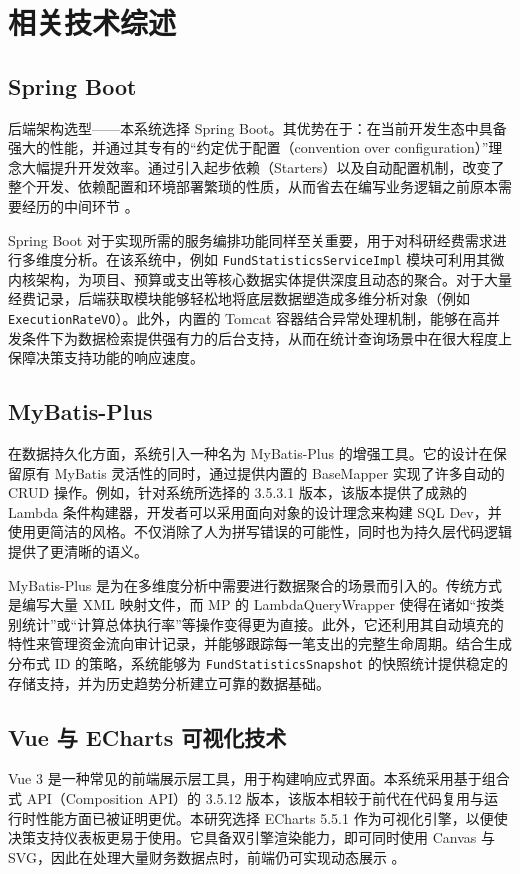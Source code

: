 \chapter{相关技术综述}
\section{Spring Boot}
后端架构选型——本系统选择 Spring Boot。其优势在于：在当前开发生态中具备强大的性能，并通过其专有的“约定优于配置（convention over configuration）”理念大幅提升开发效率。通过引入起步依赖（Starters）以及自动配置机制，改变了整个开发、依赖配置和环境部署繁琐的性质，从而省去在编写业务逻辑之前原本需要经历的中间环节 \cite{Yang2021, Zhao2020}。

Spring Boot 对于实现所需的服务编排功能同样至关重要，用于对科研经费需求进行多维度分析。在该系统中，例如 \texttt{FundStatisticsServiceImpl} 模块可利用其微内核架构，为项目、预算或支出等核心数据实体提供深度且动态的聚合。对于大量经费记录，后端获取模块能够轻松地将底层数据塑造成多维分析对象（例如 \texttt{ExecutionRateVO}）。此外，内置的 Tomcat 容器结合异常处理机制，能够在高并发条件下为数据检索提供强有力的后台支持，从而在统计查询场景中在很大程度上保障决策支持功能的响应速度。
\section{MyBatis-Plus}
在数据持久化方面，系统引入一种名为 MyBatis-Plus 的增强工具。它的设计在保留原有 MyBatis 灵活性的同时，通过提供内置的 BaseMapper 实现了许多自动的 CRUD 操作。例如，针对系统所选择的 3.5.3.1 版本，该版本提供了成熟的 Lambda 条件构建器，开发者可以采用面向对象的设计理念来构建 SQL Dev，并使用更简洁的风格。不仅消除了人为拼写错误的可能性，同时也为持久层代码逻辑提供了更清晰的语义。

MyBatis-Plus 是为在多维度分析中需要进行数据聚合的场景而引入的。传统方式是编写大量 XML 映射文件，而 MP 的 LambdaQueryWrapper 使得在诸如“按类别统计”或“计算总体执行率”等操作变得更为直接。此外，它还利用其自动填充的特性来管理资金流向审计记录，并能够跟踪每一笔支出的完整生命周期。结合生成分布式 ID 的策略，系统能够为 \texttt{FundStatisticsSnapshot} 的快照统计提供稳定的存储支持，并为历史趋势分析建立可靠的数据基础。

\section{Vue 与 ECharts 可视化技术}
Vue 3 是一种常见的前端展示层工具，用于构建响应式界面。本系统采用基于组合式 API（Composition API）的 3.5.12 版本，该版本相较于前代在代码复用与运行时性能方面已被证明更优。本研究选择 ECharts 5.5.1 作为可视化引擎，以便使决策支持仪表板更易于使用。它具备双引擎渲染能力，即可同时使用 Canvas 与 SVG，因此在处理大量财务数据点时，前端仍可实现动态展示 \cite{Xie2019}。

